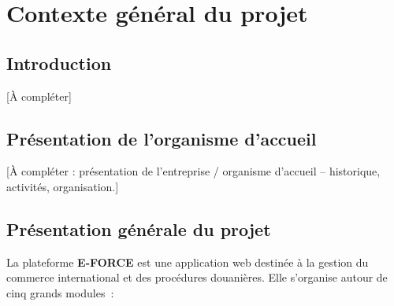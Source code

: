 \chapter{Contexte g\'en\'eral du projet}
\label{chap:contexte}

\section{Introduction}

[\`A compl\'eter]

\section{Pr\'esentation de l'organisme d'accueil}

[\`A compl\'eter : pr\'esentation de l'entreprise / organisme d'accueil --
historique, activit\'es, organisation.]

\section{Pr\'esentation g\'en\'erale du projet}

La plateforme \textbf{E-FORCE} est une application web destin\'ee \`a la
gestion du commerce international et des proc\'edures douani\`eres. Elle
s'organise autour de cinq grands modules~:

